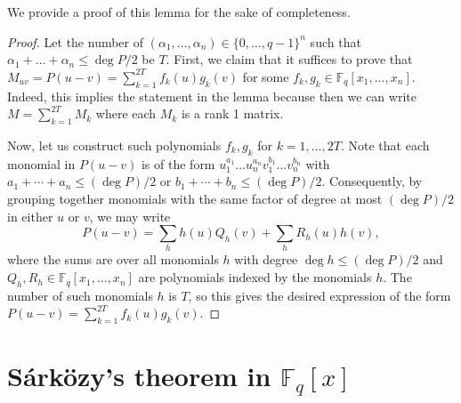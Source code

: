 \documentclass[11pt, reqno]{amsart}
\theoremstyle{definition}
\newcommand{\F}{\mathbb{F}}
\begin{document}
We provide a proof of this lemma for the sake of completeness. 

\begin{proof}
Let the number of $(\alpha_1,\ldots, \alpha_n) \in \{0, \ldots, q-1 \}^n$ such that $\alpha_1 + \ldots + \alpha_n \leq \deg P/2$ be $T$. First, we claim that it suffices to prove that $M_{uv} = P(u - v) = \sum_{k=1}^{2T} f_k(u) g_k(v)$ for some $f_k, g_k \in \F_q[x_1, \ldots, x_n]$. Indeed, this implies the statement in the lemma because then we can write $M = \sum_{k=1}^{2T} M_k$ where each $M_k$ is a rank 1 matrix. 

Now, let us construct such polynomials $f_k, g_k$ for $k=1,\dots,2T$. Note that each monomial in $P(u-v)$ is of the form $u_1^{a_1} \ldots u_n^{a_n} v_1^{b_1} \ldots v_n^{b_n}$ with $a_1 + \cdots + a_n \leq (\deg P)/2 $ or $b_1 + \cdots + b_n \leq (\deg P)/2$. Consequently, by grouping together monomials with the same factor of degree at most $(\deg P)/2$ in either $u$ or $v$, we may write \[ P(u-v) = \sum_{h}h(u)Q_h(v) + \sum_{h}R_{h}(u)h(v),\]
where the sums are over all monomials $h$ with degree $\deg h \leq (\deg P)/2$ and $Q_h, R_h \in \F_q[x_1, \ldots, x_n]$ are polynomials indexed by the monomials $h$. The number of such monomials $h$ is $T$, so this gives the desired expression of the form $P(u - v) = \sum_{k=1}^{2T} f_k(u) g_k(v)$.
\end{proof}

\section{S\'ark\"ozy's theorem in \texorpdfstring{$\mathbb{F}_q[x]$}{Fq[x]}}
\end{document}
